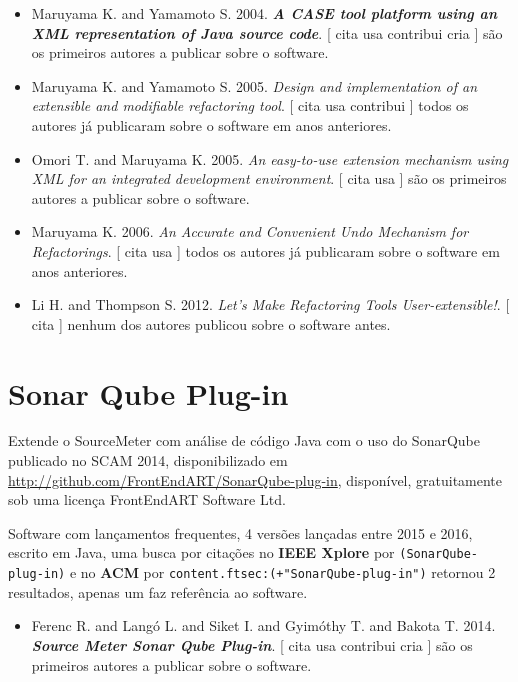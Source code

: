 \begin{itemize}
\item Maruyama K. and Yamamoto S.
      2004.
        \textbf{\textit{ A CASE tool platform using an XML representation of Java source code}}.
      [
          cita
          usa
          contribui
          cria
      ]
são os primeiros autores a publicar sobre o software.
\item Maruyama K. and Yamamoto S.
      2005.
        \textit{ Design and implementation of an extensible and modifiable refactoring tool}.
      [
          cita
          usa
          contribui
      ]
todos os autores já publicaram sobre o software em anos anteriores.
\item Omori T. and Maruyama K.
      2005.
        \textit{ An easy-to-use extension mechanism using XML for an integrated development environment}.
      [
          cita
          usa
      ]
são os primeiros autores a publicar sobre o software.
\item Maruyama K.
      2006.
        \textit{ An Accurate and Convenient Undo Mechanism for Refactorings}.
      [
          cita
          usa
      ]
todos os autores já publicaram sobre o software em anos anteriores.
\item Li H. and Thompson S.
      2012.
        \textit{ Let's Make Refactoring Tools User-extensible!}.
      [
          cita
      ]
nenhum dos autores publicou sobre o software antes.
\end{itemize}
\section{Sonar Qube Plug-in}

Extende o SourceMeter com análise de código Java com o uso do SonarQube
publicado no SCAM 2014,
disponibilizado em \url{http://github.com/FrontEndART/SonarQube-plug-in},
disponível,
gratuitamente
sob uma licença FrontEndART Software Ltd.

Software com lançamentos frequentes,
4 versões lançadas
entre 2015 e 2016,
escrito em Java,
uma busca por citações no {\bf IEEE Xplore} por
\texttt{(SonarQube-plug-in)}
e no {\bf ACM} por
\texttt{content.ftsec:(+"SonarQube-plug-in")}
retornou
2 resultados,
apenas um faz referência ao software.

\begin{itemize}
\item Ferenc R. and Langó L. and Siket I. and Gyimóthy T. and Bakota T.
      2014.
        \textbf{\textit{ Source Meter Sonar Qube Plug-in}}.
      [
          cita
          usa
          contribui
          cria
      ]
são os primeiros autores a publicar sobre o software.
\end{itemize}
